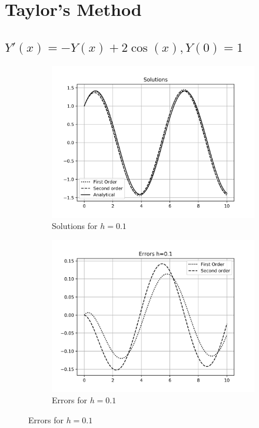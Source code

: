 \documentclass[12,a4paper]{article}
\begin{document}
    \section{Taylor's Method}
    \subsection{$Y'(x) = -Y(x) + 2\cos(x), Y(0) = 1$}
    
    \begin{figure}[H]
        \centering
        \begin{subfigure}[t]{0.49\textwidth}
            \includegraphics[width = \textwidth]{plots/taylor_h1.png}
            \caption{Solutions for $h = 0.1$}
            \label{fig:sol_ta1}
        \end{subfigure}
        \begin{subfigure}[t]{0.49\textwidth}
            \includegraphics[width = \textwidth]{plots/taylor_error_h1.png}
            \caption{Errors for $h =  0.1$}
            \label{fig:err_ta1}
        \end{subfigure}
    \end{figure}
\end{document}
